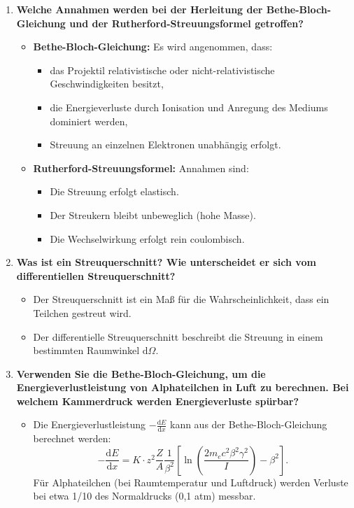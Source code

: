 \documentclass[a4paper,12pt]{article}
\begin{document}
\begin{enumerate}
    \item \textbf{Welche Annahmen werden bei der Herleitung der Bethe-Bloch-Gleichung und der Rutherford-Streuungsformel getroffen?}
    \begin{itemize}
        \item \textbf{Bethe-Bloch-Gleichung:} Es wird angenommen, dass:
        \begin{itemize}
            \item das Projektil relativistische oder nicht-relativistische Geschwindigkeiten besitzt,
            \item die Energieverluste durch Ionisation und Anregung des Mediums dominiert werden,
            \item Streuung an einzelnen Elektronen unabhängig erfolgt.
        \end{itemize}
        \item \textbf{Rutherford-Streuungsformel:} Annahmen sind:
        \begin{itemize}
            \item Die Streuung erfolgt elastisch.
            \item Der Streukern bleibt unbeweglich (hohe Masse).
            \item Die Wechselwirkung erfolgt rein coulombisch.
        \end{itemize}
    \end{itemize}

    \item \textbf{Was ist ein Streuquerschnitt? Wie unterscheidet er sich vom differentiellen Streuquerschnitt?}
    \begin{itemize}
        \item Der Streuquerschnitt ist ein Maß für die Wahrscheinlichkeit, dass ein Teilchen gestreut wird. 
        \item Der differentielle Streuquerschnitt beschreibt die Streuung in einem bestimmten Raumwinkel $\mathrm{d}\Omega$.
    \end{itemize}

    \item \textbf{Verwenden Sie die Bethe-Bloch-Gleichung, um die Energieverlustleistung von Alphateilchen in Luft zu berechnen. Bei welchem Kammerdruck werden Energieverluste spürbar?}
    \begin{itemize}
        \item Die Energieverlustleistung \( -\frac{\mathrm{d}E}{\mathrm{d}x} \) kann aus der Bethe-Bloch-Gleichung berechnet werden: 
        \[
        -\frac{\mathrm{d}E}{\mathrm{d}x} = K \cdot z^2 \frac{Z}{A} \frac{1}{\beta^2} \left[\ln\left(\frac{2m_e c^2 \beta^2 \gamma^2}{I}\right) - \beta^2\right].
        \]
        Für Alphateilchen (bei Raumtemperatur und Luftdruck) werden Verluste bei etwa 1/10 des Normaldrucks (0,1 atm) messbar.


\end{itemize}
\end{enumerate}
\end{document}
